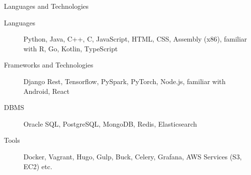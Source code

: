 \documentclass[]{mcdowellcv}
\begin{document}
	\begin{cvsection}{Languages and Technologies}
		\begin{cvsubsection}{}{}{}
			\begin{description}
				\item[Languages] Python, Java, C++, C, JavaScript, HTML, CSS, Assembly (x86), familiar with R, Go, Kotlin, TypeScript
				\item[Frameworks and Technologies] Django Rest, Tensorflow, PySpark, PyTorch, Node.js, familiar with Android, React
				\item[DBMS] Oracle SQL, PostgreSQL, MongoDB, Redis, Elasticsearch
				\item[Tools] Docker, Vagrant, Hugo, Gulp, Buck, Celery, Grafana, AWS Services (S3, EC2) etc. %
			\end{description}
		\end{cvsubsection}
	\end{cvsection}
\end{document}

